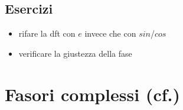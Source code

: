 \subsection{Esercizi}

\begin{itemize}

  \item rifare la dft con $e$ invece che con $sin$/$cos$
  \item verificare la giustezza della fase 

\end{itemize}

\section{Fasori complessi (cf.\cite[2.4 p.40]{steiglitz1974introduction})}

